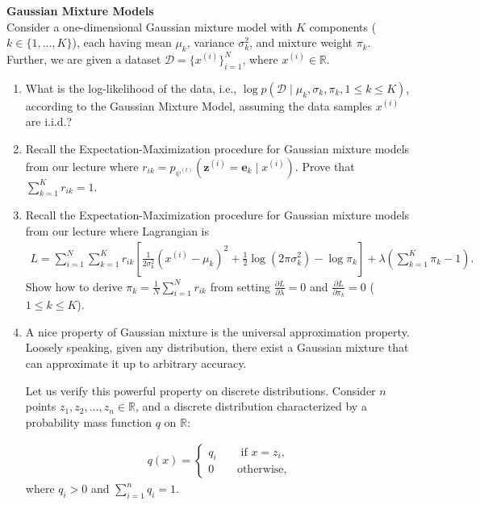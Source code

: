 \begin{Q}
\textbf{\Large Gaussian Mixture Models}\\

Consider a one-dimensional Gaussian mixture model with $K$ components ($k\in\{1, \ldots, K\}$), each having mean $\mu_k$, variance $\sigma_k^2$, and mixture weight $\pi_k$. Further, we are given a dataset $\mathcal{D} = \{x^{(i)}\}_{i=1}^N$, where $x^{(i)} \in \mathbb{R}$.


\begin{enumerate}

\item What is the log-likelihood of the data, i.e., $\log p(\mathcal{D}\mid \mu_k, \sigma_k, \pi_k, 1\leq k\leq K)$, according to the Gaussian Mixture Model, assuming the data samples $x^{(i)}$ are i.i.d.? 

\item Recall the Expectation-Maximization procedure for Gaussian mixture models from our lecture where $r_{ik}=p_{\psi^{(t)}}(\bm{z}^{(i)}=\bm{e}_{k}\mid x^{(i)})$. Prove that $\sum_{k=1}^K r_{ik}=1$.

\item Recall the Expectation-Maximization procedure for Gaussian mixture models from our lecture where Lagrangian is
\begin{align*}
    L=\sum_{i=1}^N\sum_{k=1}^K r_{ik}[\tfrac{1}{2\sigma_k^2}(x^{(i)}-\mu_k)^2+\tfrac{1}{2}\log (2\pi \sigma_k^2)-\log \pi_k]+\lambda(\sum_{k=1}^K\pi_k -1).
\end{align*}
Show how to derive $\pi_k=\tfrac{1}{N}\sum_{i=1}^N r_{ik}$ from setting $\tfrac{\partial L}{\partial \lambda}=0$ and $\tfrac{\partial L}{\partial \pi_k}=0$ ($1\leq k\leq K$).

\item A nice property of Gaussian mixture is the universal approximation property. Loosely speaking, given any distribution, there exist a Gaussian mixture that can approximate it up to arbitrary accuracy. 

Let us verify this powerful property on discrete distributions. Consider $n$ points $z_1, z_2,\dots, z_n\in \mathbb{R}$, and a discrete distribution characterized by a probability mass function $q$ on $\mathbb{R}$:

\begin{align*}
    q(x)= \begin{cases}
    q_i& \quad \text{ if } x=z_i,\\
    0&\quad \text{otherwise},
    \end{cases}
\end{align*}
where $q_i>0$ and $\sum_{i=1}^n q_i=1$.


\end{enumerate}
\end{Q}

